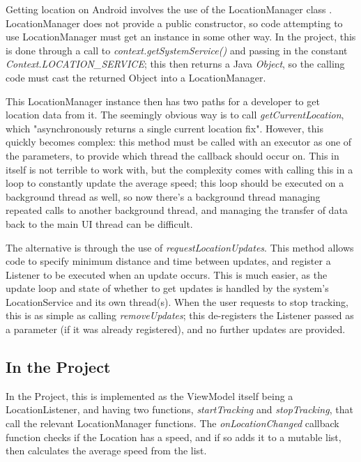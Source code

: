 \documentclass[11pt, a4paper, notitlepage]{report}
\begin{document}
Getting location on Android involves the use of the LocationManager class \citep{locationAndroid}. LocationManager does not provide a public constructor, so code attempting to use LocationManager must get an instance in some other way. In the project, this is done through a call to \textit{context.getSystemService()} and passing in the constant \textit{Context.LOCATION\_SERVICE}; this then returns a Java \textit{Object}, so the calling code must cast the returned Object into a LocationManager.

This LocationManager instance then has two paths for a developer to get location data from it. The seemingly obvious way is to call \textit{getCurrentLocation}, which "asynchronously returns a single current location fix". However, this quickly becomes complex: this method must be called with an executor as one of the parameters, to provide which thread the callback should occur on. This in itself is not terrible to work with, but the complexity comes with calling this in a loop to constantly update the average speed; this loop should be executed on a background thread as well, so now there's a background thread managing repeated calls to another background thread, and managing the transfer of data back to the main UI thread can be difficult.

The alternative is through the use of \textit{requestLocationUpdates}. This method allows code to specify minimum distance and time between updates, and register a Listener to be executed when an update occurs. This is much easier, as the update loop and state of whether to get updates is handled by the system's LocationService and its own thread(s). When the user requests to stop tracking, this is as simple as calling \textit{removeUpdates}; this de-registers the Listener passed as a parameter (if it was already registered), and no further updates are provided.

\subsection{In the Project}
In the Project, this is implemented as the ViewModel itself being a LocationListener, and having two functions, \textit{startTracking} and \textit{stopTracking}, that call the relevant LocationManager functions. The \textit{onLocationChanged} callback function checks if the Location has a speed, and if so adds it to a mutable list, then calculates the average speed from the list.
\end{document}
